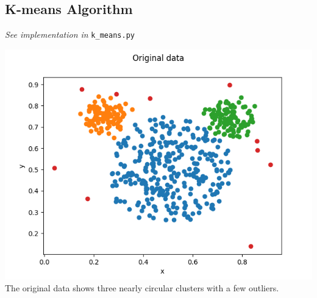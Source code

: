     \subsection{K-means Algorithm}
    \label{subseq:kmeans}
    \textit{See implementation in} \texttt{k\_means.py}

    \includegraphics[width=\textwidth/2]{plots/mickey_original} \\
    The original data shows three nearly circular clusters with a few outliers.

